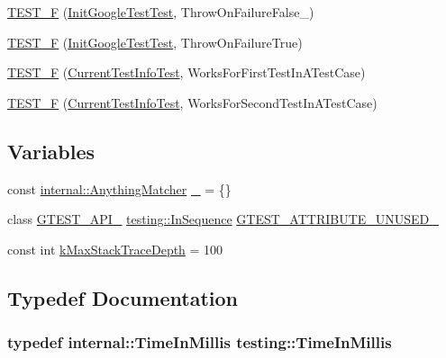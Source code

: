 \begin{DoxyCompactItemize}
\item 
\hyperlink{namespacetesting_adfcdbd6b2715fddd03a47a822517ddea}{T\+E\+S\+T\+\_\+F} (\hyperlink{classtesting_1_1_init_google_test_test}{Init\+Google\+Test\+Test}, Throw\+On\+Failure\+False\+\_)
\item 
\hyperlink{namespacetesting_ad7513c23ff21a4d2761cadfd2afe87e1}{T\+E\+S\+T\+\_\+F} (\hyperlink{classtesting_1_1_init_google_test_test}{Init\+Google\+Test\+Test}, Throw\+On\+Failure\+True)
\item 
\hyperlink{namespacetesting_a1e55a3ca18d877e1e83ce0ed9e7b5c79}{T\+E\+S\+T\+\_\+F} (\hyperlink{classtesting_1_1_current_test_info_test}{Current\+Test\+Info\+Test}, Works\+For\+First\+Test\+In\+A\+Test\+Case)
\item 
\hyperlink{namespacetesting_a3775bdbb5d24619425c52103e7ae6434}{T\+E\+S\+T\+\_\+F} (\hyperlink{classtesting_1_1_current_test_info_test}{Current\+Test\+Info\+Test}, Works\+For\+Second\+Test\+In\+A\+Test\+Case)
\end{DoxyCompactItemize}
\subsection*{Variables}
\begin{DoxyCompactItemize}
\item 
const \hyperlink{classtesting_1_1internal_1_1_anything_matcher}{internal\+::\+Anything\+Matcher} \hyperlink{namespacetesting_a4ba77a3f5b67166ff1b59d96a32346a2}{\+\_\+} = \{\}
\item 
class \hyperlink{gtest-port_8h_aa73be6f0ba4a7456180a94904ce17790}{G\+T\+E\+S\+T\+\_\+\+A\+P\+I\+\_\+} \hyperlink{classtesting_1_1_in_sequence}{testing\+::\+In\+Sequence} \hyperlink{namespacetesting_ae028f80705ba0f84ce7d036bf3793448}{G\+T\+E\+S\+T\+\_\+\+A\+T\+T\+R\+I\+B\+U\+T\+E\+\_\+\+U\+N\+U\+S\+E\+D\+\_\+}
\item 
const int \hyperlink{namespacetesting_ae605f2ccac04616bb7812ca72e517082}{k\+Max\+Stack\+Trace\+Depth} = 100
\end{DoxyCompactItemize}


\subsection{Typedef Documentation}
\subsubsection[{\texorpdfstring{Time\+In\+Millis}{TimeInMillis}}]{\setlength{\rightskip}{0pt plus 5cm}typedef {\bf internal\+::\+Time\+In\+Millis} {\bf testing\+::\+Time\+In\+Millis}}\hypertarget{namespacetesting_a992de1d091ce660f451d1e8b3ce30fd6}{}\label{namespacetesting_a992de1d091ce660f451d1e8b3ce30fd6}


